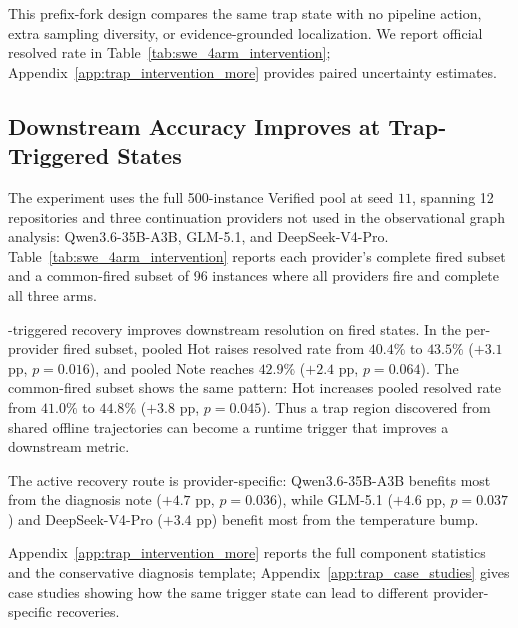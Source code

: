 This prefix-fork design compares the same trap state with no pipeline action, extra sampling diversity, or evidence-grounded localization.
We report official \swe{} resolved rate in Table~\ref{tab:swe_4arm_intervention}; Appendix~\ref{app:trap_intervention_more} provides paired uncertainty estimates.

\subsection{Downstream Accuracy Improves at Trap-Triggered States}
\label{sec:swe_intervention}

The experiment uses the full 500-instance \swe{} Verified pool at seed $11$, spanning 12 repositories and three continuation providers not used in the observational graph analysis: Qwen3.6-35B-A3B, GLM-5.1, and DeepSeek-V4-Pro.
Table~\ref{tab:swe_4arm_intervention} reports each provider's complete fired subset and a common-fired subset of 96 instances where all providers fire and complete all three arms.

\method{}-triggered recovery improves downstream resolution on fired states.
In the per-provider fired subset, pooled Hot raises resolved rate from $40.4\%$ to $43.5\%$ ($+3.1$ pp, $p{=}0.016$), and pooled Note reaches $42.9\%$ ($+2.4$ pp, $p{=}0.064$).
The common-fired subset shows the same pattern: Hot increases pooled resolved rate from $41.0\%$ to $44.8\%$ ($+3.8$ pp, $p{=}0.045$).
Thus a trap region discovered from shared offline trajectories can become a runtime trigger that improves a downstream metric.

The active recovery route is provider-specific: Qwen3.6-35B-A3B benefits most from the diagnosis note ($+4.7$ pp, $p{=}0.036$), while GLM-5.1 ($+4.6$ pp, $p{=}0.037$) and DeepSeek-V4-Pro ($+3.4$ pp) benefit most from the temperature bump.

Appendix~\ref{app:trap_intervention_more} reports the full component statistics and the conservative diagnosis template; Appendix~\ref{app:trap_case_studies} gives case studies showing how the same trigger state can lead to different provider-specific recoveries.
